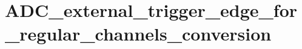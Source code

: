 \hypertarget{group___a_d_c__external__trigger__edge__for__regular__channels__conversion}{\section{A\-D\-C\-\_\-external\-\_\-trigger\-\_\-edge\-\_\-for\-\_\-regular\-\_\-channels\-\_\-conversion}
\label{group___a_d_c__external__trigger__edge__for__regular__channels__conversion}
}
